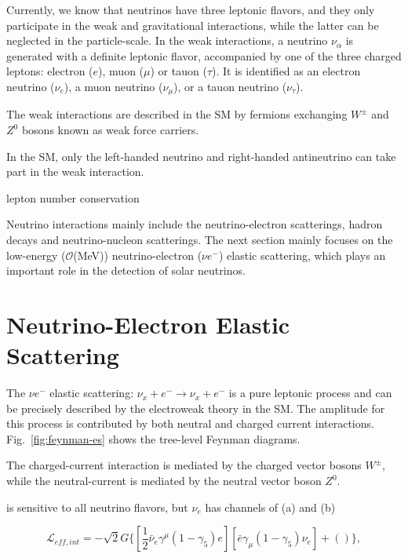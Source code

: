 Currently, we know that neutrinos have three leptonic flavors, and they only participate in the weak and gravitational interactions, while the latter can be neglected in the particle-scale. In the weak interactions, a neutrino $\nu_\alpha$ is generated with a definite leptonic flavor, accompanied by one of the three charged leptons: electron ($e$), muon ($\mu$) or tauon ($\tau$). It is identified as an electron neutrino ($\nu_e$), a muon neutrino ($\nu_\mu$), or a tauon neutrino ($\nu_\tau$).

The weak interactions are described in the SM by fermions exchanging $W^{\pm}$ and $Z^0$ bosons known as weak force carriers.

In the SM, only the left-handed neutrino and right-handed antineutrino can take part in the weak interaction.



lepton number conservation

Neutrino interactions mainly include the neutrino-electron scatterings, hadron decays and neutrino-nucleon scatterings\cite{giunti2007fundamentals}. The next section mainly focuses on the low-energy ($\mathcal{O}$(MeV)) neutrino-electron ($\nu e^-$) elastic scattering, which plays an important role in the detection of solar neutrinos.

\section{Neutrino-Electron Elastic Scattering}\label{sect:nuInteraction}
The $\nu e^-$ elastic scattering: $\nu_x + e^{-}\to\nu_x+e^-$ is a pure leptonic process and can be precisely described by the electroweak theory in the SM. The amplitude for this process is contributed by both neutral and charged current interactions. Fig.~\ref{fig:feynman-es} shows the tree-level Feynman diagrams.

The charged-current interaction is mediated by the charged vector bosons $W^\pm$, while the neutral-current is mediated by the neutral vector boson $Z^0$.

is sensitive to all neutrino flavors, but $\nu_e$ has channels of (a) and (b)




\begin{equation}
\mathcal{L}_{eff,int}=-\sqrt{2}G\{[\frac{1}{2}\bar{\nu}_e\gamma^\mu(1-\gamma_5)e][\bar{e}\gamma_\mu(1-\gamma_5)\nu_e]+()\},
\end{equation}


